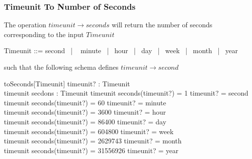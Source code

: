 \documentclass[../../main.tex]{subfiles}
\begin{document}
\subsubsection{Timeunit To Number of Seconds}

The operation $timeunit \to seconds$ will return the number of seconds corresponding to the input $Timeunit$
\begin{zed}
  Timeunit ::= second ~| ~ minute ~| ~hour ~| ~day ~| ~week ~| ~month ~| ~year
\end{zed}
such that the following schema defines $timeunit \to second$
\begin{schema}{toSeconds[Timeunit]}
  timeunit? : Timeunit \\
  timeunit \to secdons : Timeunit \fun \nat
  \where
  timeunit \to seconds(timeunit?) = 1 \iff timeunit? = second \\
  timeunit \to seconds(timeunit?) = 60 \iff timeunit? = minute \\
  timeunit \to seconds(timeunit?) = 3600 \iff timeunit? = hour \\
  timeunit \to seconds(timeunit?) = 86400 \iff timeunit? = day \\
  timeunit \to seconds(timeunit?) = 604800 \iff timeunit? = week \\
  timeunit \to seconds(timeunit?) = 2629743 \iff timeunit? = month \\
  timeunit \to seconds(timeunit?) = 31556926 \iff timeunit? = year
\end{schema}
\end{document}
